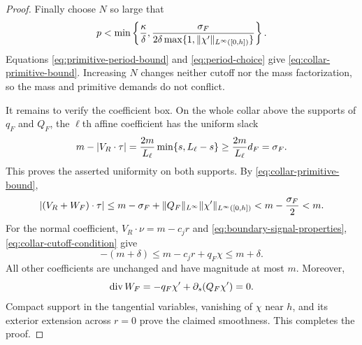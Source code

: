 \begin{proof}
Finally choose $N$ so large that
\begin{equation}
\label{eq:period-choice}
 p<\min\left\{\frac{\kappa}{\delta},
 \frac{\sigma_F}{2\delta\max\{1,\lVert \chi' \rVert_{L^\infty([0,h])}\}}\right\}.
\end{equation}
Equations \eqref{eq:primitive-period-bound} and \eqref{eq:period-choice} give
\eqref{eq:collar-primitive-bound}.  Increasing $N$ changes neither cutoff nor
the mass factorization, so the mass and primitive demands do not conflict.

It remains to verify the coefficient box.  On the whole collar above the
supports of $q_F$ and $Q_F$, the $\ell$th affine coefficient has the uniform
slack
\begin{equation}
\label{eq:uniform-slack-bound}
 m-\lvert V_R\cdot\tau \rvert
 =\frac{2m}{L_\ell}\min\{s,L_\ell-s\}
 \ge\frac{2m}{L_\ell}d_F=\sigma_F.
\end{equation}
This proves the asserted uniformity on both supports.  By
\eqref{eq:collar-primitive-bound},
\[
 \lvert (V_R+W_F)\cdot\tau \rvert
 \le m-\sigma_F+\lVert Q_F \rVert_{L^\infty}
       \lVert \chi' \rVert_{L^\infty([0,h])}
 <m-\frac{\sigma_F}{2}<m.
\]
For the normal coefficient, $V_R\cdot\nu=m-c_jr$ and
\eqref{eq:boundary-signal-properties}, \eqref{eq:collar-cutoff-condition}
give
\[
 -(m+\delta)
 \le m-c_jr+q_F\chi\le m+\delta.
\]
All other coefficients are unchanged and have magnitude at most $m$.
Moreover,
\[
 \operatorname{div} W_F=-q_F\chi'+\partial_s(Q_F\chi')=0.
\]
Compact support in the tangential variables, vanishing of $\chi$ near $h$,
and its exterior extension across $r=0$ prove the claimed smoothness.  This
completes the proof.
\end{proof}

